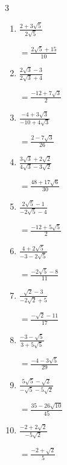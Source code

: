 \begin{multicols}{3}
\begin{enumerate}
        $\displaystyle =\frac{-2\sqrt{5}-20}{19}$

\columnbreak %

\resetques

  \item $\displaystyle \frac{2+3\sqrt{5}}{2\sqrt{5}}$

        $\displaystyle =\frac{2\sqrt{5}+15}{10}$

  \item $\displaystyle \frac{2\sqrt{3}-3}{2\sqrt{3}+4}$

        $\displaystyle =\frac{-12+7\sqrt{3}}{2}$

  \item $\displaystyle \frac{-4+3\sqrt{3}}{-10+4\sqrt{3}}$

        $\displaystyle =\frac{2-7\sqrt{3}}{26}$

  \item $\displaystyle \frac{3\sqrt{3}+2\sqrt{2}}{4\sqrt{3}-3\sqrt{2}}$

        $\displaystyle =\frac{48+17\sqrt{6}}{30}$

  \item $\displaystyle \frac{2\sqrt{5}-1}{-2\sqrt{5}-4}$

        $\displaystyle =\frac{-12+5\sqrt{5}}{2}$

\columnbreak %

  \item $\displaystyle \frac{4+2\sqrt{5}}{-3-2\sqrt{5}}$

        $\displaystyle =\frac{-2\sqrt{5}-8}{11}$

  \item $\displaystyle \frac{\sqrt{2}-3}{-2\sqrt{2}+5}$

        $\displaystyle =\frac{-\sqrt{2}-11}{17}$

  \item $\displaystyle \frac{-3-\sqrt{5}}{3+5\sqrt{5}}$

        $\displaystyle =\frac{-4-3\sqrt{5}}{29}$

  \item $\displaystyle \frac{5\sqrt{5}-\sqrt{2}}{-\sqrt{5}-5\sqrt{2}}$

        $\displaystyle =\frac{35-26\sqrt{10}}{45}$

  \item $\displaystyle \frac{-2+2\sqrt{2}}{-5\sqrt{2}}$

        $\displaystyle =\frac{-2+\sqrt{2}}{5}$

\columnbreak %


\end{enumerate}
\end{multicols}
